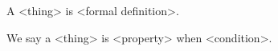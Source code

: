 \begin{RATheoremBox}[title={Definition 1 (<short name>)}]
A <thing> is <formal definition>.

We say a <thing> is <property> when <condition>.
\end{RATheoremBox}
